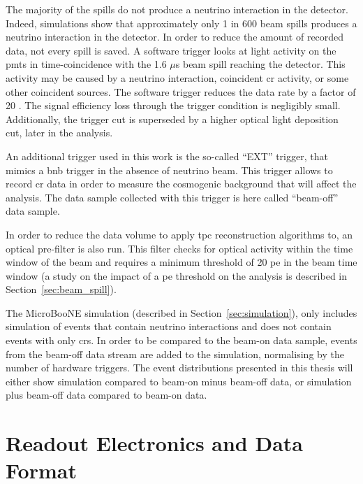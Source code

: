 The majority of the spills do not produce a neutrino interaction in the detector.  Indeed, simulations show that approximately only 1 in 600 beam spills produces a neutrino interaction in the detector. In order to reduce the amount of recorded data, not every spill is saved. A software trigger looks at light activity on the \acrshort{pmt}s in time-coincidence with the 1.6 $\mu$s beam spill reaching the detector. 
This activity may be caused by a neutrino interaction, coincident \acrshort{cr} activity, or some other coincident sources.
The software trigger reduces the data rate by a factor of 20 \cite{CaratelliThesis}. The signal efficiency loss through the trigger condition is negligibly small. Additionally, the trigger cut is superseded by a higher optical light deposition cut, later in the analysis. 

An additional trigger used in this work is the so-called ``EXT'' trigger, that mimics a \acrshort{bnb} trigger in the absence of neutrino beam. This trigger allows to record \acrshort{cr} data in order to measure the cosmogenic background that will affect the analysis. The data sample collected with this trigger is here called ``beam-off'' data sample.

In order to reduce the data volume to apply \acrshort{tpc} reconstruction algorithms to, an optical pre-filter is also run. This filter checks for optical activity within the time window of the beam and requires a minimum threshold of 20 \acrfull{pe} in the beam time window (a study on the impact of a \acrshort{pe} threshold on the analysis is described in Section~\ref{sec:beam_spill}).

The MicroBooNE simulation (described in Section~\ref{sec:simulation}), only includes simulation of events that contain neutrino interactions and does not contain events with only \acrshort{cr}s. In order to be compared to the beam-on data sample, events from the beam-off data stream are added to the simulation, normalising by the number of hardware triggers.
The event distributions presented in this thesis will either show simulation compared to beam-on minus beam-off data, or simulation plus beam-off data compared to beam-on data.




\section[Readout and Data Format]{Readout Electronics and Data Format}
\label{sec:readout_data_format}

